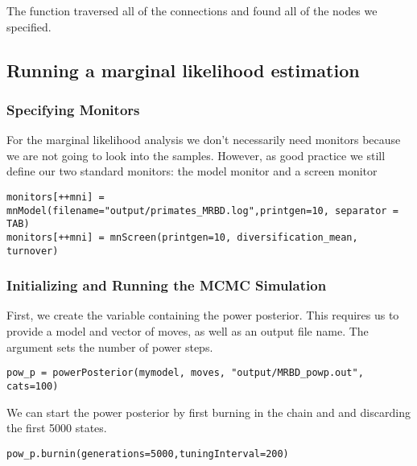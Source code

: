 The  function traversed all of the connections and found all of the nodes we specified.


\subsection{Running a marginal likelihood estimation}

\subsubsection{Specifying Monitors}

For the marginal likelihood analysis we don't necessarily need monitors because we are not going to look into the samples.
However, as good practice we still define our two standard monitors: the model monitor and a screen monitor
{\tt \begin{snugshade*}
\begin{lstlisting}
monitors[++mni] = mnModel(filename="output/primates_MRBD.log",printgen=10, separator = TAB)
monitors[++mni] = mnScreen(printgen=10, diversification_mean, turnover)
\end{lstlisting}
\end{snugshade*}}

\subsubsection{Initializing and Running the MCMC Simulation}



First, we create the variable containing the power posterior.
This requires us to provide a model and vector of moves, as well as an output file name.
The  argument sets the number of power steps.
{\tt \begin{snugshade*}
\begin{lstlisting}
pow_p = powerPosterior(mymodel, moves, "output/MRBD_powp.out", cats=100)
\end{lstlisting}
\end{snugshade*}}

We can start the power posterior by first burning in the chain and and discarding the first 5000 states.
{\tt \begin{snugshade*}
\begin{lstlisting}
pow_p.burnin(generations=5000,tuningInterval=200)
\end{lstlisting}
\end{snugshade*}}

